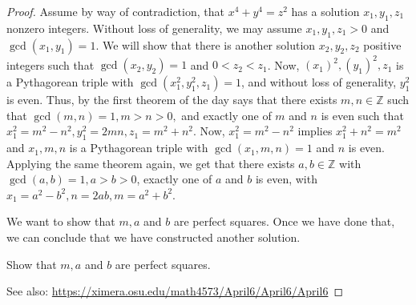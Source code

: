 \documentclass[letterpaper, 11 pt]{article}
\begin{document}
\begin{proof}
 Assume by way of contradiction, that $x^4+y^4=z^2$ has a solution $x_1,y_1, z_1$ nonzero integers. Without loss of generality, we may assume $x_1,y_1,z_1>0$ and $\gcd(x_1,y_1)=1$. We will show that there is another solution $x_2,y_2,z_2$ positive integers such that $\gcd(x_2,y_2)=1$ and $0<z_2<z_1$. Now, $(x_1)^2,(y_1)^2, z_1$ is a Pythagorean triple with $\gcd(x_1^2,y_1^2,z_1)=1$, and without loss of generality, $y_1^2$ is even. Thus, by the first theorem of the day says that there exists $m,n\in\mathbb{Z}$ such that $\gcd(m,n)=1,m>n>0,$ and exactly one of $m$ and $n$ is even such that $x_1^2=m^2-n^2, y_1^2=2mn, z_1=m^2+n^2$. Now, $x_1^2=m^2-n^2$ implies $x_1^2+n^2=m^2$ and $x_1,m,n$ is a Pythagorean triple with $\gcd(x_1,m,n)=1$ and $n$ is even. Applying the same theorem again, we get that there exists $a,b\in\mathbb{Z}$ with $\gcd(a,b)=1,a>b>0$, exactly one of $a$ and $b$ is even, with $x_1=a^2-b^2, n=2ab, m=a^2+b^2$. 
 
 We want to show that $m,a$ and $b$ are perfect squares. Once we have done that, we can conclude that we have constructed another solution.
 
 
\begin{br}[15 minutes]
 Show that $m,a$ and $b$ are perfect squares.
\end{br}
See also: \url{https://ximera.osu.edu/math4573/April6/April6/April6}
\phantom{\qedhere}%
\end{proof}
\end{document}

